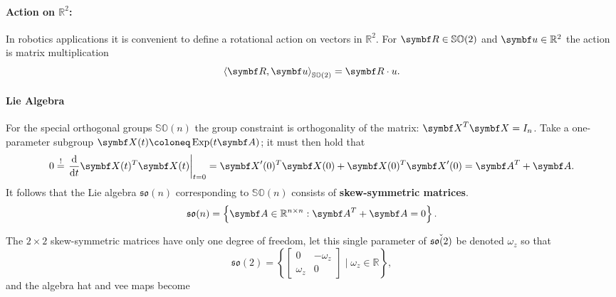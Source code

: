 \paragraph{Action on $\mathbb{R}^2$:}
In robotics applications it is convenient to define a rotational action on vectors in $\mathbb{R}^2$. For $\bR \in \SOtwo$ and $\bu \in \mathbb{R}^2$ the action is matrix multiplication
\begin{equation}
  \left \langle \bR, \bu \right \rangle_{\SOtwo} = \bR \cdot u.
\end{equation}

\paragraph{Lie Algebra}

For the special orthogonal groups $\mathbb{SO}(n)$ the group constraint is orthogonality of the matrix: $\X^T \X = I_n$. Take a one-parameter subgroup $\X(t) \coloneq \Exp(t \A)$; it must then hold that
\begin{equation}
  0 \overset{!}= \left. \frac{\mathrm{d}}{\mathrm{d} t} \X(t)^T \X(t) \right|_{t=0} = \X'(0)^T \X(0) + \X(0)^T \X'(0) = \A^T + \A.
\end{equation}
It follows that the Lie algebra $\mathfrak{so}(n)$ corresponding to $\mathbb{SO}(n)$ consists of \textbf{skew-symmetric matrices}.
\begin{equation}
  \mathfrak{so}(n) = \left\{ \A \in \mathbb{R}^{n \times n} : \A^T + \A = 0 \right\}.
\end{equation}

The $2 \times 2$ skew-symmetric matrices have only one degree of freedom, let this single parameter of $\check{{\mathfrak{so}(2)}}$ be denoted $\omega_z$ so that
\begin{equation}
  \mathfrak{so}(2) = \left\{ \begin{bmatrix} 0 & -\omega_z \\ \omega_z & 0 \end{bmatrix} \mid \omega_z \in \mathbb{R} \right\},
\end{equation}
and the algebra hat and vee maps become
\begin{center}
\end{center}
